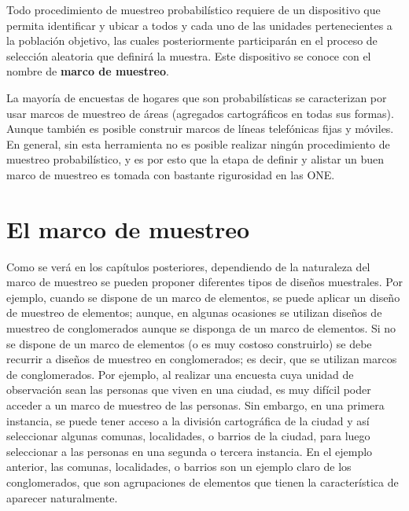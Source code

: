 \documentclass[
  12pt,
  spanish,
]{book}
\begin{document}
Todo procedimiento de muestreo probabilístico requiere de un dispositivo que permita identificar y ubicar a todos y cada uno de las unidades pertenecientes a la población objetivo, las cuales posteriormente participarán en el proceso de selección aleatoria que definirá la muestra. Este dispositivo se conoce con el nombre de \textbf{marco de muestreo}.

La mayoría de encuestas de hogares que son probabilísticas se caracterizan por usar marcos de muestreo de áreas (agregados cartográficos en todas sus formas). Aunque también es posible construir marcos de líneas telefónicas fijas y móviles. En general, sin esta herramienta no es posible realizar ningún procedimiento de muestreo probabilístico, y es por esto que la etapa de definir y alistar un buen marco de muestreo es tomada con bastante rigurosidad en las ONE.

\hypertarget{el-marco-de-muestreo}{%
\section{El marco de muestreo}\label{el-marco-de-muestreo}}

Como se verá en los capítulos posteriores, dependiendo de la naturaleza del marco de muestreo se pueden proponer diferentes tipos de diseños muestrales. Por ejemplo, cuando se dispone de un marco de elementos, se puede aplicar un diseño de muestreo de elementos; aunque, en algunas ocasiones se utilizan diseños de muestreo de conglomerados aunque se disponga de un marco de elementos. Si no se dispone de un marco de elementos (o es muy costoso construirlo) se debe recurrir a diseños de muestreo en conglomerados; es decir, que se utilizan marcos de conglomerados. Por ejemplo, al realizar una encuesta cuya unidad de observación sean las personas que viven en una ciudad, es muy difícil poder acceder a un marco de muestreo de las personas. Sin embargo, en una primera instancia, se puede tener acceso a la división cartográfica de la ciudad y así seleccionar algunas comunas, localidades, o barrios de la ciudad, para luego seleccionar a las personas en una segunda o tercera instancia. En el ejemplo anterior, las comunas, localidades, o barrios son un ejemplo claro de los conglomerados, que son agrupaciones de elementos que tienen la característica de aparecer naturalmente.
\end{document}
